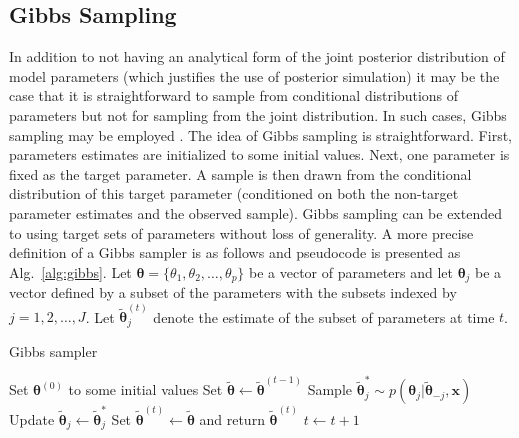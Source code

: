 \begin{DoubleSpace*}
\subsection{Gibbs Sampling}
In addition to not having an analytical form of the joint posterior distribution of model parameters (which justifies the use of posterior simulation) it may be the case that it is straightforward to sample from conditional distributions of parameters but not for sampling from the joint distribution. In such cases, Gibbs sampling may be employed \cite{gelman2004,hoff2009}. The idea of Gibbs sampling is straightforward. First, parameters estimates are initialized to some initial values. Next, one parameter is fixed as the target parameter. A sample is then drawn from the conditional distribution of this target parameter (conditioned on both the non-target parameter estimates and the observed sample). Gibbs sampling can be extended to using target sets of parameters without loss of generality. A more precise definition of a Gibbs sampler is as follows and pseudocode is presented as Alg.~\ref{alg:gibbs}. Let $\boldsymbol{\theta}=\{\theta_1, \theta_2, \hdots,  \theta_p \}$ be a vector of parameters and let $\boldsymbol{\theta}_j$ be a vector defined by a subset of the parameters with the subsets indexed by $j=1, 2, \hdots, J$. Let $\tilde{\boldsymbol{\theta}}_j^{(t)}$ denote the estimate of the subset of parameters at time $t$. 

\begin{algorithm}
	\caption{Gibbs sampler
		\label{alg:gibbs}}
\begin{algorithmic}[1]
	\STATE Set $\boldsymbol{\theta}^{(0)}$ to some initial values
		\STATE Set $\tilde{\boldsymbol{\theta}} \leftarrow \tilde{\boldsymbol{\theta}}^{(t-1)}$
			\STATE Sample $\tilde{\boldsymbol{\theta}}_j^{*}\sim p \left(\boldsymbol{\theta}_j|\tilde{\boldsymbol{\theta}}_{-j}, \textbf{x} \right)$
			\STATE Update $\tilde{\boldsymbol{\theta}}_j \leftarrow \tilde{\boldsymbol{\theta}}_j^{*}$
		\ENDFOR
		\STATE Set $\tilde{\boldsymbol{\theta}}^{(t)} \leftarrow \tilde{\boldsymbol{\theta}}$ and return $\tilde{\boldsymbol{\theta}}^{(t)} $
		\STATE $t \leftarrow t+1$
	\ENDWHILE
\end{algorithmic}
\end{algorithm} 


\end{DoubleSpace*}
